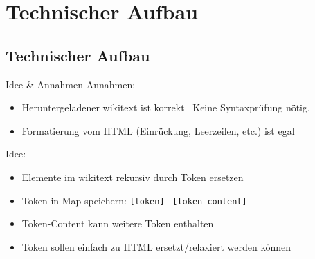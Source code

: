 \documentclass[9pt]{beamer}
\begin{document}
	\section{Technischer Aufbau}
	
	\subsection{Technischer Aufbau}
	
	\begin{frame}{Idee \& Annahmen}
		Annahmen:
		\begin{itemize}
			\item Heruntergeladener wikitext ist korrekt \textrightarrow\ Keine Syntaxprüfung nötig.
			\item Formatierung vom HTML (Einrückung, Leerzeilen, etc.) ist egal
		\end{itemize}\pause
		Idee:
		\begin{itemize}
			\item Elemente im wikitext rekursiv durch Token ersetzen
			\item Token in Map speichern: \texttt{[token]} \textrightarrow\ \texttt{[token-content]}
			\item Token-Content kann weitere Token enthalten
			\item Token sollen einfach zu HTML ersetzt/relaxiert werden können
		\end{itemize}
	\end{frame}
	
\end{document}

